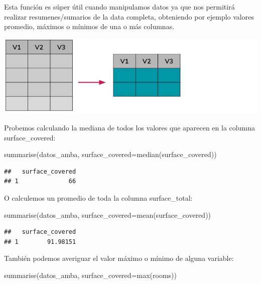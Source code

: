 \documentclass[
  spanish,
]{book}
\newenvironment{Shaded}{\begin{snugshade}}{\end{snugshade}}
\newcommand{\AttributeTok}[1]{\textcolor[rgb]{0.77,0.63,0.00}{#1}}
\newcommand{\FunctionTok}[1]{\textcolor[rgb]{0.00,0.00,0.00}{#1}}
\newcommand{\NormalTok}[1]{#1}
\begin{document}
Esta función es súper útil cuando manipulamos datos ya que nos permitirá realizar resumenes/sumarios de la data completa, obteniendo por ejemplo valores promedio, máximos o mínimos de una o más columnas.

\includegraphics{images/tidyverse_agrupar.jpg}

Probemos calculando la mediana de todos los valores que aparecen en la columna surface\_covered:

\begin{Shaded}
\begin{Highlighting}[]
\FunctionTok{summarise}\NormalTok{(datos\_amba, }\AttributeTok{surface\_covered=}\FunctionTok{median}\NormalTok{(surface\_covered))}
\end{Highlighting}
\end{Shaded}

\begin{verbatim}
##   surface_covered
## 1              66
\end{verbatim}

O calculemos un promedio de toda la columna surface\_total:

\begin{Shaded}
\begin{Highlighting}[]
\FunctionTok{summarise}\NormalTok{(datos\_amba, }\AttributeTok{surface\_covered=}\FunctionTok{mean}\NormalTok{(surface\_covered))}
\end{Highlighting}
\end{Shaded}

\begin{verbatim}
##   surface_covered
## 1        91.98151
\end{verbatim}

También podemos averiguar el valor máximo o mínimo de alguna variable:

\begin{Shaded}
\begin{Highlighting}[]
\FunctionTok{summarise}\NormalTok{(datos\_amba, }\AttributeTok{surface\_covered=}\FunctionTok{max}\NormalTok{(rooms))}
\end{Highlighting}
\end{Shaded}
\end{document}
